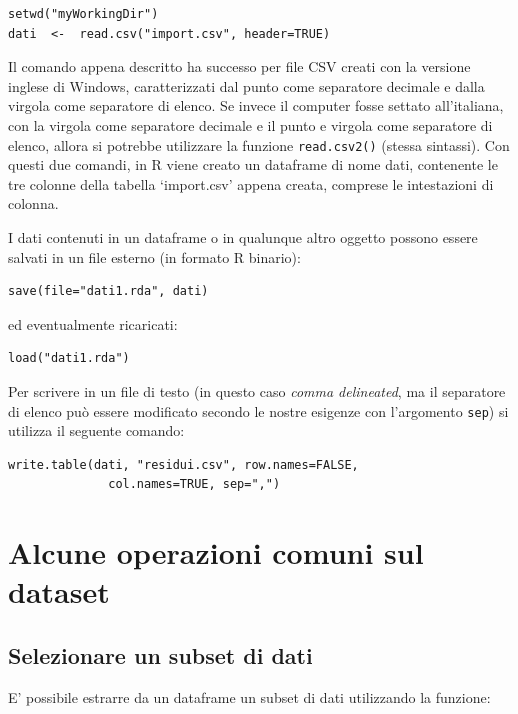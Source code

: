 \documentclass[a4paper,12pt,oneside]{book}
\begin{document}
\begin{verbatim}
setwd("myWorkingDir")
dati  <-  read.csv("import.csv", header=TRUE)
\end{verbatim}

Il comando appena descritto ha successo per file CSV creati con la
versione inglese di Windows, caratterizzati dal punto come separatore
decimale e dalla virgola come separatore di elenco. Se invece il
computer fosse settato all'italiana, con la virgola come separatore
decimale e il punto e virgola come separatore di elenco, allora si
potrebbe utilizzare la funzione \texttt{read.csv2()} (stessa sintassi).
Con questi due comandi, in R viene creato un dataframe di nome dati,
contenente le tre colonne della tabella `import.csv' appena creata,
comprese le intestazioni di colonna.

I dati contenuti in un dataframe o in qualunque altro oggetto possono
essere salvati in un file esterno (in formato R binario):

\begin{verbatim}
save(file="dati1.rda", dati)
\end{verbatim}

ed eventualmente ricaricati:

\begin{verbatim}
load("dati1.rda")
\end{verbatim}

Per scrivere in un file di testo (in questo caso \emph{comma
delineated}, ma il separatore di elenco può essere modificato secondo le
nostre esigenze con l'argomento \texttt{sep}) si utilizza il seguente
comando:

\begin{verbatim}
write.table(dati, "residui.csv", row.names=FALSE, 
              col.names=TRUE, sep=",")
\end{verbatim}

\section{Alcune operazioni comuni sul
dataset}\label{alcune-operazioni-comuni-sul-dataset}

\subsection{Selezionare un subset di
dati}\label{selezionare-un-subset-di-dati}

E' possibile estrarre da un dataframe un subset di dati utilizzando la
funzione:
\end{document}
